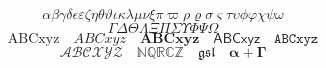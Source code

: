 \documentclass{article}
\begin{document}
\[\alpha\beta\gamma\delta\epsilon\varepsilon\zeta\eta\theta\vartheta\iota\kappa\lambda\mu\nu\xi\pi\varpi\rho\varrho\sigma\varsigma\tau\upsilon\phi\varphi\chi\psi\omega\]
\[\Gamma\Delta\Theta\Lambda\Xi\Pi\Sigma\Upsilon\Phi\Psi\Omega\]
\[\mathrm{ABCxyz}\quad\mathit{ABCxyz}\quad\mathbf{ABCxyz}\quad\mathsf{ABCxyz}\quad\mathtt{ABCxyz}\]
\[\mathcal{ABCXYZ}\quad\mathbb{NQRCZ}\quad\mathfrak{gsl}\quad\boldsymbol{\alpha+\Gamma}\]
\end{document}
